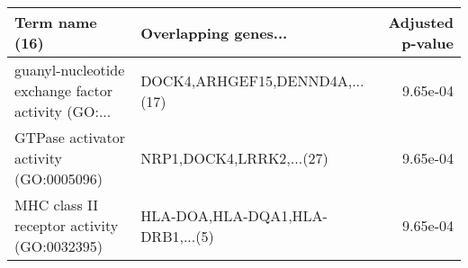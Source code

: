 \begin{tabular}{llr}
\toprule
                                    Term name (16) &             Overlapping genes... &  Adjusted p-value \\
\midrule
guanyl-nucleotide exchange factor activity (GO:... &   DOCK4,ARHGEF15,DENND4A,...(17) &          9.65e-04 \\
            GTPase activator activity (GO:0005096) &         NRP1,DOCK4,LRRK2,...(27) &          9.65e-04 \\
       MHC class II receptor activity (GO:0032395) & HLA-DOA,HLA-DQA1,HLA-DRB1,...(5) &          9.65e-04 \\
\bottomrule
\end{tabular}
